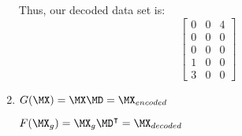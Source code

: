 \begin{enumerate}
Thus, our decoded data set is:
$$\begin{bmatrix} 0 & 0 & 4\\ 0 & 0 & 0\\ 0 & 0 & 0\\ 1 & 0 & 0\\ 3 & 0 & 0 \end{bmatrix}$$
    \item $G(\MX) = \MX\MD = \MX_{encoded}$

$F(\MX_g) = \MX_g\MD^\intercal = \MX_{decoded}$
\end{enumerate}